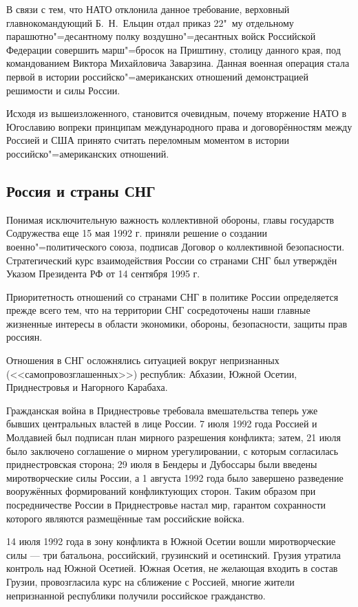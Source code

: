 В связи с тем, что НАТО отклонила данное требование, верховный главнокомандующий Б.~Н.~Ельцин отдал приказ 22"~му отдельному парашютно"=десантному полку воздушно"=десантных войск Российской Федерации совершить марш"=бросок на Приштину, столицу данного края, под командованием Виктора Михайловича Заварзина. Данная военная операция стала первой в истории российско"=американских отношений демонстрацией решимости и силы России.

Исходя из вышеизложенного, становится очевидным, почему вторжение НАТО в Югославию вопреки принципам международного права и договорённостям между Россией и США принято считать переломным моментом в истории российско"=американских отношений.
\subsection{Россия и страны СНГ}
Понимая исключительную важность коллективной обороны, главы государств Содружества еще 15 мая 1992 г. приняли решение о создании военно"=политического союза, подписав Договор о коллективной безопасности. Стратегический курс взаимодействия России со странами СНГ был утверждён Указом Президента РФ от 14 сентября 1995 г.

Приоритетность отношений со странами СНГ в политике России определяется прежде всего тем, что на территории СНГ сосредоточены наши главные жизненные интересы в области экономики, обороны, безопасности, защиты прав россиян.

Отношения в СНГ осложнялись ситуацией вокруг непризнанных (<<самопровозглашенных>>) республик: Абхазии, Южной Осетии, Приднестровья и Нагорного Карабаха.

Гражданская война в Приднестровье требовала вмешательства теперь уже бывших центральных властей в лице России. 7 июля 1992 года Россией и Молдавией был подписан план мирного разрешения конфликта; затем, 21 июля было заключено соглашение о мирном урегулировании, с которым согласилась приднестровская сторона; 29 июля в Бендеры и Дубоссары были введены миротворческие силы России, а 1 августа 1992 года было завершено разведение вооружённых формирований конфликтующих сторон. Таким образом при посредничестве России в Приднестровье настал мир, гарантом сохранности которого являются размещённые там российские войска.

14 июля 1992 года в зону конфликта в Южной Осетии вошли миротворческие силы --- три батальона, российский, грузинский и осетинский. Грузия утратила контроль над Южной Осетией. Южная Осетия, не желающая входить в состав Грузии, провозгласила курс на сближение с Россией, многие жители непризнанной республики получили российское гражданство.
